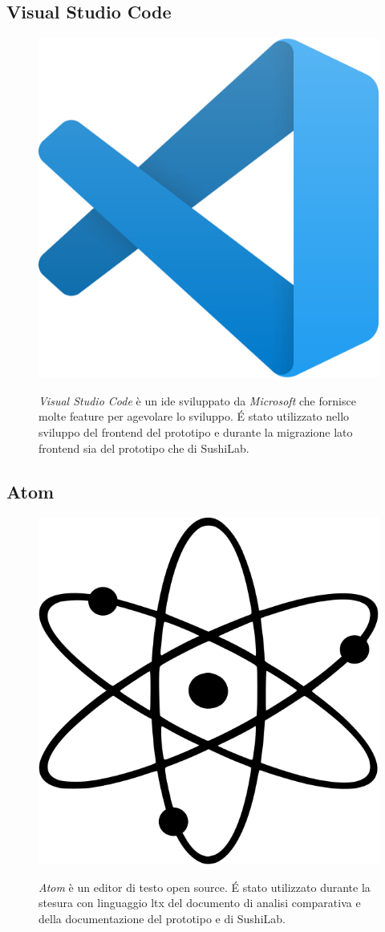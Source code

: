 \subsection*{Visual Studio Code}
\begin{figure}[ht]
  \begin{minipage}[h]{0.3\linewidth}
    \centering
    \includegraphics[width=0.4\linewidth]{immagini/visualStudioCode.png}
  \end{minipage}
  \begin{minipage}[!h]{0.7\linewidth}
    \textit{Visual Studio Code} è un \gls{ide} sviluppato da \textit{Microsoft} che fornisce molte feature per agevolare lo sviluppo.
    É stato utilizzato nello sviluppo del frontend del prototipo e durante la migrazione lato frontend sia del prototipo che di SushiLab.
  \end{minipage}
\end{figure}
\subsection*{Atom}
\FloatBarrier
\begin{figure}[!h]
  \begin{minipage}[h]{0.3\linewidth}
    \centering
    \includegraphics[width=0.5\linewidth]{immagini/atom.png}
  \end{minipage}
  \begin{minipage}[!h]{0.7\linewidth}
    \textit{Atom} è un editor di testo open source. É stato utilizzato durante la stesura con linguaggio \gls{ltx} del documento di analisi comparativa e della documentazione del prototipo e di SushiLab.
  \end{minipage}
\end{figure}
\FloatBarrier
